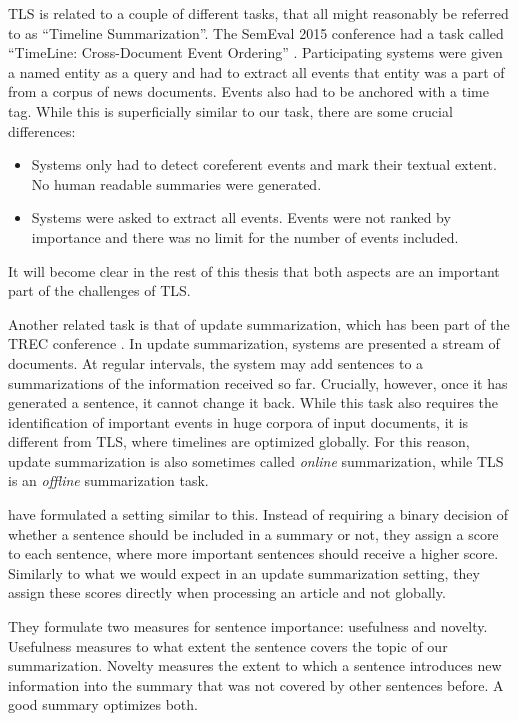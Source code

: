\documentclass[a4paper,BCOR=10mm]{report}
\numberwithin{lemma}{chapter}
\numberwithin{definition}{chapter}
\begin{document}

TLS is related to a couple of different tasks, that all might reasonably be referred to as ``Timeline Summarization''.
The SemEval 2015 conference had a task called ``TimeLine: Cross-Document Event Ordering'' \citep{semeval-timeline}. Participating systems were given a named entity as a query and had to extract all events that entity was a part of from a corpus of news documents. Events also had to be anchored with a time tag.
While this is superficially similar to our task, there are some crucial differences:

\begin{itemize}
    \item{Systems only had to detect coreferent events and mark their textual extent. No human readable summaries were generated. }
    \item{Systems were asked to extract all events. Events were not ranked by importance and there was no limit for the number of events included. }
\end{itemize}

It will become clear in the rest of this thesis that both aspects are an important part of the challenges of TLS.

Another related task is that of update summarization, which has been part of the TREC conference \citep{trec-update}.
In update summarization, systems are presented a stream of documents.
At regular intervals, the system may add sentences to a summarizations of the information received so far.
Crucially, however, once it has generated a sentence, it cannot change it back.
While this task also requires the identification of important events in huge corpora of input documents, it is different from TLS, where timelines are optimized globally. For this reason, update summarization is also sometimes called \textit{online} summarization, while TLS is an \textit{offline} summarization task.

\citet{swan+allen-temporal-summaries} have formulated a setting similar to this. Instead of requiring a binary decision of whether a sentence should be included in a summary or not, they assign a score to each sentence, where more important sentences should receive a higher score. Similarly to what we would expect in an update summarization setting, they assign these scores directly when processing an article and not globally.

They formulate two measures for sentence importance: usefulness and novelty.
Usefulness measures to what extent the sentence covers the topic of our summarization. Novelty measures the extent to which a sentence introduces new information into the summary that was not covered by other sentences before.
A good summary optimizes both.
\end{document}
